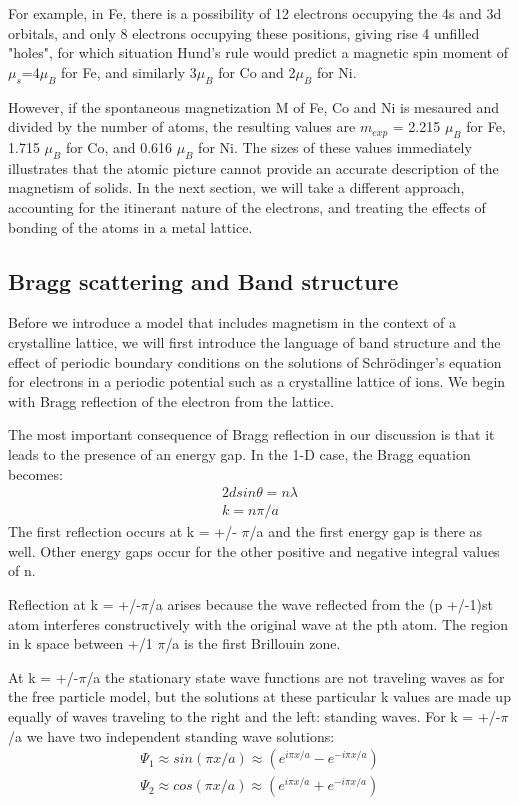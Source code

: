 For example, in Fe, there is a possibility of 12 electrons occupying the 4s and 3d orbitals, and only 8 electrons occupying these positions, giving rise 4 unfilled "holes", for which situation Hund's rule would predict a magnetic spin moment of $\mu_s$=4$\mu_B$ for Fe, and similarly 3$\mu_B$ for Co and 2$\mu_B$ for Ni.

However, if the spontaneous magnetization M of Fe, Co and Ni is mesaured and divided by the number of atoms, the resulting values are $m_{exp}$ = 2.215 $\mu_B$ for Fe, 1.715 $\mu_B$ for Co, and 0.616 $\mu_B$ for Ni. The sizes of these values immediately illustrates that the atomic picture cannot provide an accurate description of the magnetism of solids. In the next section, we will take a different approach, accounting for the itinerant nature of the electrons, and treating the effects of bonding of the atoms in a metal lattice.

\subsection{Bragg scattering and Band structure}
Before we introduce a model that includes magnetism in the context of a crystalline lattice, we will first introduce the language of band structure and the effect of periodic boundary conditions on the solutions of Schr\"odinger's equation for electrons in a periodic potential such as a crystalline lattice of ions. We begin with Bragg reflection of the electron from the lattice.

The most important consequence of Bragg reflection in our discussion is that it leads to the presence of an energy gap. In the 1-D case, the Bragg equation becomes:
\begin{equation}
\begin{split}
2dsin\theta = n\lambda \\
k = n\pi/a
\end{split}
\end{equation}
The first reflection occurs at k = +/- $\pi$/a and the first energy gap is there as well. Other energy gaps occur for the other positive and negative integral values of n.

Reflection at k = +/-$\pi$/a arises because the wave reflected from the (p +/-1)st atom interferes constructively with the original wave at the pth atom. The region in k space between +/1 $\pi$/a is the first Brillouin zone.

At k = +/-$\pi$/a the stationary state wave functions are not traveling waves as for the free particle model, but the solutions at these particular k values are made up equally of waves traveling to the right and the left: standing waves.  For k = +/-$\pi$/a we have two independent standing wave solutions:
\begin{equation}
\begin{split}
\Psi_1 \approx sin(\pi x/a) \approx (e^{i\pi x/a}- e^{-i\pi x /a}) \\
\Psi_2 \approx cos(\pi x/a) \approx (e^{i\pi x/a}+ e^{-i\pi x /a})
\end{split}
\end{equation}

